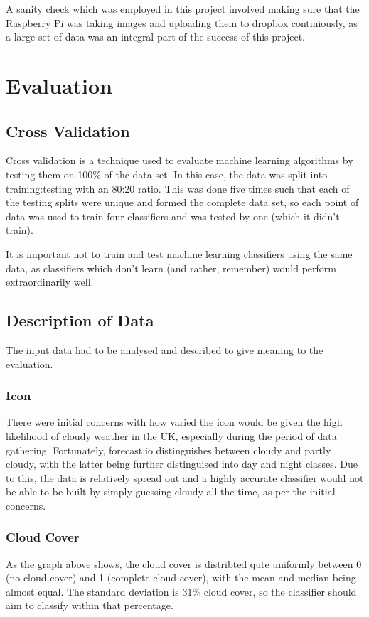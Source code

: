 \documentclass[a4paper,12pt,twoside]{report}
\begin{document}
A sanity check which was employed in this project involved making sure that the Raspberry Pi was taking images and uploading them to dropbox continiously, as a large set of data was an integral part of the success of this project.


\chapter{Evaluation}

\section{Cross Validation}
Cross validation is a technique used to evaluate machine learning algorithms by testing them on 100\% of the data set. In this case, the data was split into training:testing with an 80:20 ratio. This was done five times such that each of the testing splits were unique and formed the complete data set, so each point of data was used to train four classifiers and was tested by one (which it didn't train).

It is important not to train and test machine learning classifiers using the same data, as classifiers which don't learn (and rather, remember) would perform extraordinarily well.

\section{Description of Data}
The input data had to be analysed and described to give meaning to the evaluation. 

\subsection{Icon}
There were initial concerns with how varied the icon would be given the high likelihood of cloudy weather in the UK, especially during the period of data gathering. Fortunately, forecast.io distinguishes between cloudy and partly cloudy, with the latter being further distinguised into day and night classes. Due to this, the data is relatively spread out and a highly accurate classifier would not be able to be built by simply guessing cloudy all the time, as per the initial concerns.

\subsection{Cloud Cover}
As the graph above shows, the cloud cover is distribted qute uniformly between 0 (no cloud cover) and 1 (complete cloud cover), with the mean and median being almost equal. The standard deviation is 31\% cloud cover, so the classifier should aim to classify within that percentage.
\end{document}
